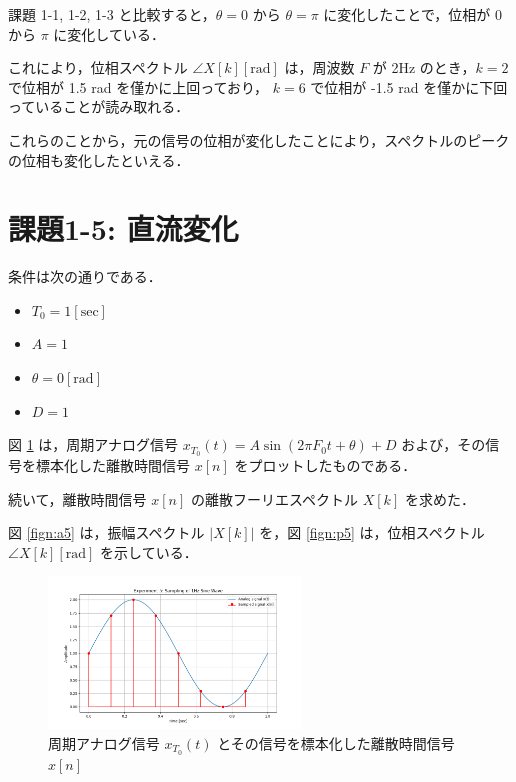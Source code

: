 \documentclass[fleqn, a4paper. 12pt]{jsarticle}
\begin{document}
    課題 1-1, 1-2, 1-3 と比較すると，$\theta = 0$ から $\theta = \pi$ に変化したことで，位相が 0 から $\pi$ に変化している．

    これにより，位相スペクトル $\angle X[k][\mathrm{rad}]$ は，周波数 $F$ が 2Hz のとき，$k=2$ で位相が 1.5 rad を僅かに上回っており， $k=6$ で位相が -1.5 rad を僅かに下回っていることが読み取れる．

    これらのことから，元の信号の位相が変化したことにより，スペクトルのピークの位相も変化したといえる．

  \newpage

  \section*{課題1-5: 直流変化}

  条件は次の通りである．

  \begin{itemize}
    \item $T_0 = 1 [\mathrm{sec}]$
    \item $A = 1$
    \item $\theta = 0 [\mathrm{rad}]$
    \item $D = 1$
  \end{itemize}

  図 \ref{fig:s5} は，周期アナログ信号 $x_{T_0}(t)=A \sin \left(2 \pi F_0 t+\theta\right)+D$ および，その信号を標本化した離散時間信号 $x[n]$ をプロットしたものである．

  続いて，離散時間信号 $x[n]$ の離散フーリエスペクトル $X[k]$ を求めた．

  図 \ref{fign:a5} は，振幅スペクトル $|X[k]|$ を，図 \ref{fign:p5} は，位相スペクトル $\angle X[k][\mathrm{rad}]$ を示している．

  \begin{figure}[!h]
    \centering
    \includegraphics[width=0.6\textwidth]{sampling_experiment_5.png}
    \caption{周期アナログ信号 $x_{T_0}(t)$ とその信号を標本化した離散時間信号 $x[n]$}
    \label{fig:s5}
  \end{figure}
\end{document}
